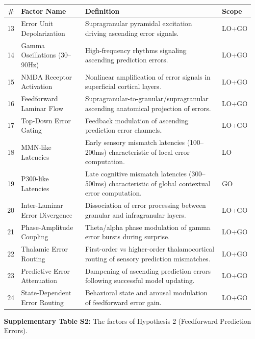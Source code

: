 \documentclass[12pt]{article}
\providecommand{\DIFaddbegin}{} %
\providecommand{\DIFaddend}{} %
\providecommand{\DIFaddincludegraphics}[2][]{{\color{blue}\fbox{\DIFOincludegraphics[#1]{#2}}}} %
\DeclareRobustCommand{\DIFaddbegin}{\DIFOaddbegin \let\includegraphics\DIFaddincludegraphics} %
\DeclareRobustCommand{\DIFaddend}{\DIFOaddend \let\includegraphics\DIFOincludegraphics} %
\begin{document}
\DIFaddbegin \begingroup
\small
\noindent\begin{tabularx}{\textwidth}{@{}r p{1.6in} >{\raggedright\arraybackslash}X l@{}}
\toprule
\textbf{\#} & \textbf{Factor Name} & \textbf{Definition} & \textbf{Scope} \\
\midrule
13 & Error Unit Depolarization & Supragranular pyramidal excitation driving ascending error signals. & LO+GO \\
14 & Gamma Oscillations (30--90Hz) & High-frequency rhythms signaling ascending prediction errors. & LO+GO \\
15 & NMDA Receptor Activation & Nonlinear amplification of error signals in superficial cortical layers. & LO+GO \\
16 & Feedforward Laminar Flow & Supragranular-to-granular/supragranular ascending anatomical projection of errors. & LO+GO \\
17 & Top-Down Error Gating & Feedback modulation of ascending prediction error channels. & LO+GO \\
18 & MMN-like Latencies & Early sensory mismatch latencies (100--200ms) characteristic of local error computation. & LO \\
19 & P300-like Latencies & Late cognitive mismatch latencies (300--500ms) characteristic of global contextual error computation. & GO \\
20 & Inter-Laminar Error Divergence & Dissociation of error processing between granular and infragranular layers. & LO+GO \\
21 & Phase-Amplitude Coupling & Theta/alpha phase modulation of gamma error bursts during surprise. & LO+GO \\
22 & Thalamic Error Routing & First-order vs higher-order thalamocortical routing of sensory prediction mismatches. & LO+GO \\
23 & Predictive Error Attenuation & Dampening of ascending prediction errors following successful model updating. & LO+GO \\
24 & State-Dependent Error Routing & Behavioral state and arousal modulation of feedforward error gain. & LO+GO \\
\bottomrule
\end{tabularx}
\endgroup
\vspace{0.4em}

\noindent\DIFaddend \textbf{Supplementary Table S2:} The factors of Hypothesis 2 (Feedforward Prediction Errors).
\end{document}
